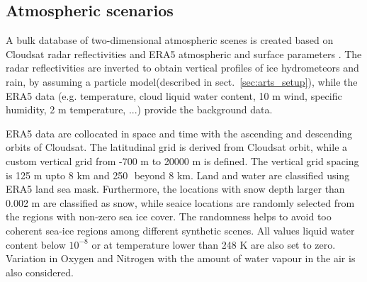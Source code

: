 \documentclass[amt, manuscript]{copernicus}
\begin{document}




\subsection{Atmospheric scenarios}
\label{sec:atm_scenes}

A bulk database of two-dimensional atmospheric scenes is created based on Cloudsat radar reflectivities \citep{marchand:hydro:08} and ERA5 atmospheric and surface parameters \citep{era5:18}. The radar reflectivities are inverted to obtain vertical profiles of ice hydrometeors and rain, by assuming a particle model(described in sect.~\ref{sec:arts_setup}), while the ERA5 data (e.g. temperature, cloud liquid water content, 10\,\,m wind, specific humidity, 2\,\,m temperature, ...) provide the background data.

ERA5 data are collocated in space and time with the ascending and descending orbits of Cloudsat. The latitudinal grid is derived from Cloudsat orbit, while a custom vertical grid from -700\,\,m to 20000\,\,m is defined. The vertical grid spacing is 125\,\,m upto 8\,\,km and 250\,\, beyond 8\,\,km. Land and water are classified using ERA5 land sea mask. Furthermore, the locations with snow depth larger than 0.002\,\,m are classified as snow, while seaice locations are randomly selected from the regions with non-zero sea ice cover. The randomness helps to avoid too coherent sea-ice regions among different synthetic scenes.
All values liquid water content below $10^{-8}$ or at temperature lower than 248\,\,K are also set to zero. Variation in Oxygen and Nitrogen with the amount of water vapour in the air is also considered.  
\end{document}

